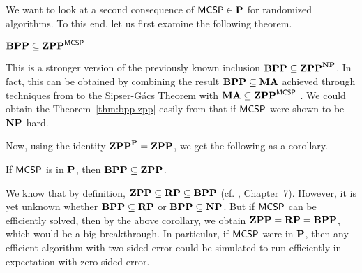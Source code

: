 \documentclass[11pt]{article}
\begin{document}



\bigskip

We want to look at a second consequence of $\mathprob{MCSP} \in \P$
for randomized algorithms.
To this end, let us first examine the following theorem.

\begin{theorem}[\cite{10.1145/335305.335314}]
  \label{thm:bpp-zpp}
	$\BPP \subseteq \ZPP^{\mathprob{MCSP}}$
\end{theorem}

This is a stronger version of the previously known inclusion
$\BPP \subseteq \ZPP^{\NP}$.
In fact, this can be obtained by combining the result
$\BPP \subseteq \MA$ achieved through techniques from to the Sipser-G\'acs
Theorem with $\MA \subseteq \ZPP^{\mathprob{MCSP}}$ \cite{goldreich97}.
We could obtain the Theorem~\ref{thm:bpp-zpp} easily from that if
$\mathprob{MCSP}$ were shown to be $\NP$-hard.

Now, using the identity $\ZPP^\P = \ZPP$, we get the following as a corollary.

\begin{corollary}
	If $\mathprob{MCSP}$ is in $\P$, then $\BPP \subseteq \ZPP$.
\end{corollary}

We know that by definition, $\ZPP \subseteq \RP \subseteq \BPP$
(cf. \cite{arora2009}, Chapter~7).
However, it is yet unknown whether
$\BPP \subseteq \RP$ or $\BPP \subseteq \NP$.
But if $\mathprob{MCSP}$ can be
efficiently solved, then by the above corollary, we obtain $\ZPP = \RP = \BPP$,
which would be a big breakthrough.
%
In particular, if $\mathprob{MCSP}$ were in $\P$, then any efficient algorithm
with two-sided error could be simulated to run efficiently in
expectation with zero-sided error.
\end{document}
